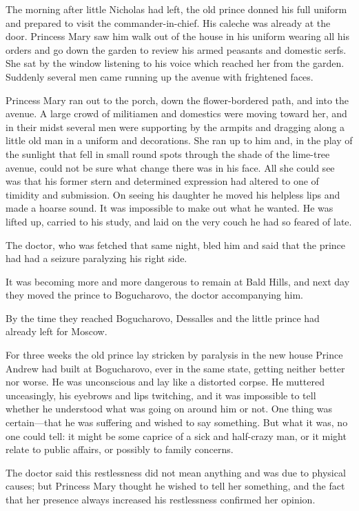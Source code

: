The morning after little Nicholas had left, the old prince donned
his full uniform and prepared to visit the
commander-in-chief. His caleche was already at the door. Princess
Mary saw him walk out of the house in his uniform wearing all his
orders and go down the garden to review his armed peasants and
domestic serfs. She sat by the window listening to his voice
which reached her from the garden. Suddenly several men came
running up the avenue with frightened faces.

Princess Mary ran out to the porch, down the flower-bordered
path, and into the avenue. A large crowd of militiamen and
domestics were moving toward her, and in their midst several men
were supporting by the armpits and dragging along a little old
man in a uniform and decorations. She ran up to him and, in the
play of the sunlight that fell in small round spots through the
shade of the lime-tree avenue, could not be sure what change
there was in his face. All she could see was that his former
stern and determined expression had altered to one of timidity
and submission. On seeing his daughter he moved his helpless lips
and made a hoarse sound. It was impossible to make out what he
wanted. He was lifted up, carried to his study, and laid on the
very couch he had so feared of late.

The doctor, who was fetched that same night, bled him and said
that the prince had had a seizure paralyzing his right side.

It was becoming more and more dangerous to remain at Bald Hills,
and next day they moved the prince to Bogucharovo, the doctor
accompanying him.

By the time they reached Bogucharovo, Dessalles and the little
prince had already left for Moscow.

For three weeks the old prince lay stricken by paralysis in the
new house Prince Andrew had built at Bogucharovo, ever in the
same state, getting neither better nor worse. He was unconscious
and lay like a distorted corpse. He muttered unceasingly, his
eyebrows and lips twitching, and it was impossible to tell
whether he understood what was going on around him or not. One
thing was certain---that he was suffering and wished to say
something. But what it was, no one could tell: it might be some
caprice of a sick and half-crazy man, or it might relate to
public affairs, or possibly to family concerns.

The doctor said this restlessness did not mean anything and was
due to physical causes; but Princess Mary thought he wished to
tell her something, and the fact that her presence always
increased his restlessness confirmed her opinion.

